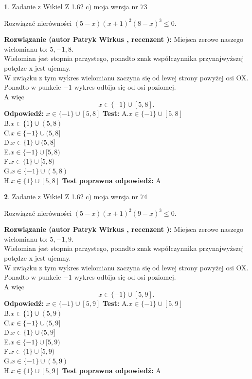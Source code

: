 \documentclass[12pt, a4paper]{article}
\theoremstyle{definition} %
\newtheorem{zad}{}
\newcommand{\zadStart}[1]{\begin{zad}#1\newline}
\newcommand{\zadStop}{\end{zad}}
\newcommand{\rozwStart}[2]{\noindent \textbf{Rozwiązanie (autor #1 , recenzent #2): }\newline}
\newcommand{\rozwStop}{\newline}
\newcommand{\odpStart}{\noindent \textbf{Odpowiedź:}\newline}
\newcommand{\odpStop}{\newline}
\newcommand{\testStart}{\noindent \textbf{Test:}\newline}
\newcommand{\testStop}{\newline}
\newcommand{\kluczStart}{\noindent \textbf{Test poprawna odpowiedź:}\newline}
\newcommand{\kluczStop}{\newline}
\begin{document}
\zadStart{Zadanie z Wikieł Z 1.62 c) moja wersja nr 73}

Rozwiązać nierówności $(5-x)(x+1)^{2}(8-x)^{3}\le0$.
\zadStop
\rozwStart{Patryk Wirkus}{}
Miejsca zerowe naszego wielomianu to: $5, -1, 8$.\\
Wielomian jest stopnia parzystego, ponadto znak współczynnika przy\linebreak najwyższej potędze x jest ujemny.\\ W związku z tym wykres wielomianu zaczyna się od lewej strony powyżej osi OX.\\
Ponadto w punkcie $-1$ wykres odbija się od osi poziomej.\\
A więc $$x \in \{-1\} \cup [5,8].$$
\rozwStop
\odpStart
$x \in \{-1\} \cup [5,8]$
\odpStop
\testStart
A.$x \in \{-1\} \cup [5,8]$\\
B.$x \in \{1\} \cup (5,8)$\\
C.$x \in \{-1\} \cup (5,8]$\\
D.$x \in \{1\} \cup (5,8]$\\
E.$x \in \{-1\} \cup [5,8)$\\
F.$x \in \{1\} \cup [5,8)$\\
G.$x \in \{-1\} \cup (5,8)$\\
H.$x \in \{1\} \cup [5,8]$
\testStop
\kluczStart
A
\kluczStop



\zadStart{Zadanie z Wikieł Z 1.62 c) moja wersja nr 74}

Rozwiązać nierówności $(5-x)(x+1)^{2}(9-x)^{3}\le0$.
\zadStop
\rozwStart{Patryk Wirkus}{}
Miejsca zerowe naszego wielomianu to: $5, -1, 9$.\\
Wielomian jest stopnia parzystego, ponadto znak współczynnika przy\linebreak najwyższej potędze x jest ujemny.\\ W związku z tym wykres wielomianu zaczyna się od lewej strony powyżej osi OX.\\
Ponadto w punkcie $-1$ wykres odbija się od osi poziomej.\\
A więc $$x \in \{-1\} \cup [5,9].$$
\rozwStop
\odpStart
$x \in \{-1\} \cup [5,9]$
\odpStop
\testStart
A.$x \in \{-1\} \cup [5,9]$\\
B.$x \in \{1\} \cup (5,9)$\\
C.$x \in \{-1\} \cup (5,9]$\\
D.$x \in \{1\} \cup (5,9]$\\
E.$x \in \{-1\} \cup [5,9)$\\
F.$x \in \{1\} \cup [5,9)$\\
G.$x \in \{-1\} \cup (5,9)$\\
H.$x \in \{1\} \cup [5,9]$
\testStop
\kluczStart
A
\kluczStop
\end{document}
